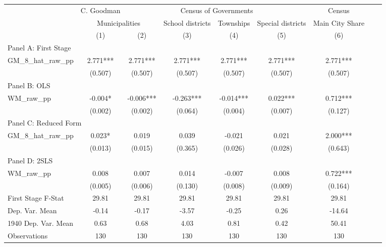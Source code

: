  \begin{tabular}{l*{8}{c}} \toprule
&\multicolumn{1}{c}{C. Goodman}&\multicolumn{4}{c}{Census of Governments}&\multicolumn{1}{c}{Census}\\\cmidrule(lr){2-2}\cmidrule(lr){3-6}\cmidrule(lr){7-7}
&\multicolumn{2}{c}{Municipalities}&\multicolumn{1}{c}{School districts}&\multicolumn{1}{c}{Townships}&\multicolumn{1}{c}{Special districts}&\multicolumn{1}{c}{Main City Share}\\\cmidrule(lr){2-3}\cmidrule(lr){4-6}\cmidrule(lr){7-7}
&\multicolumn{1}{c}{(1)}&\multicolumn{1}{c}{(2)}&\multicolumn{1}{c}{(3)}&\multicolumn{1}{c}{(4)}&\multicolumn{1}{c}{(5)}&\multicolumn{1}{c}{(6)}\\
\cmidrule(lr){1-7}
\multicolumn{6}{l}{Panel A: First Stage}\\
\cmidrule(lr){1-7}
GM\_8\_hat\_raw\_pp &    2.771***&    2.771***&    2.771***&    2.771***&    2.771***&    2.771***\\
                &  (0.507)   &  (0.507)   &  (0.507)   &  (0.507)   &  (0.507)   &  (0.507)   \\
\cmidrule(lr){1-7}
\multicolumn{6}{l}{Panel B: OLS}\\
\cmidrule(lr){1-7}
WM\_raw\_pp       &   -0.004*  &   -0.006***&   -0.263***&   -0.014***&    0.022***&    0.712***\\
                &  (0.002)   &  (0.002)   &  (0.064)   &  (0.004)   &  (0.007)   &  (0.127)   \\
\cmidrule(lr){1-7}
\multicolumn{6}{l}{Panel C: Reduced Form}\\
\cmidrule(lr){1-7}
GM\_8\_hat\_raw\_pp &    0.023*  &    0.019   &    0.039   &   -0.021   &    0.021   &    2.000***\\
                &  (0.013)   &  (0.015)   &  (0.365)   &  (0.026)   &  (0.028)   &  (0.643)   \\
\cmidrule(lr){1-7}
\multicolumn{6}{l}{Panel D: 2SLS}\\
\cmidrule(lr){1-7}
WM\_raw\_pp       &    0.008   &    0.007   &    0.014   &   -0.007   &    0.008   &    0.722***\\
                &  (0.005)   &  (0.006)   &  (0.130)   &  (0.008)   &  (0.009)   &  (0.164)   \\
\midrule
First Stage F-Stat&    29.81   &    29.81   &    29.81   &    29.81   &    29.81   &    29.81   \\
Dep. Var. Mean  &    -0.14   &    -0.17   &    -3.57   &    -0.25   &     0.26   &   -14.64   \\
1940 Dep. Var. Mean&     0.63   &     0.68   &     4.03   &     0.81   &     0.42   &    50.41   \\
Observations    &      130   &      130   &      130   &      130   &      130   &      130   \\
       \bottomrule \end{tabular}
